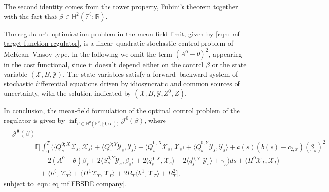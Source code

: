 \documentclass[11pt,twoside]{amsart}
\theoremstyle{definition}
\numberwithin{equation}{section}
\newcommand{\E}{\mathbb{E}}
\newcommand{\F}{\mathbb{F}}
\newcommand{\R}{\mathbb{R}}
\renewcommand{\bar}{\overline}
\begin{document}
The second identity comes from the tower property, Fubini's theorem together with the fact that $\beta\in \mathbb{H}^2(\F^0;\R)$. 

The regulator’s optimisation problem in the mean-field limit, given by \eqref{eqn: mf target function regulator}, is a linear–quadratic stochastic control problem of McKean–Vlasov type. In the following we omit the term $(A^0 - \theta)^2$, appearing in the cost functional, since it doesn't depend either on the control $\beta$ or the state variable $(\mathcal{X}, B, \mathcal{Y})$. The state variables satisfy a forward–backward system of stochastic differential equations driven by idiosyncratic and common sources of uncertainty, with the solution indicated by $(\mathcal{X}, B, \mathcal{Y}, Z^0, Z)$. 


In conclusion, the mean-field formulation of the optimal control problem of the regulator is given by $\inf_{\beta \in \mathbb{H}^2(\F^0;[0,\infty))}\mathcal{J}^0(\beta)$, where
\begin{align}
&\label{eqn: convex target function mf regulator}
    \mathcal{J}^0(\beta) \\
    &\nonumber\qquad = \E\Bigg[ \int_0^T (\langle Q^{0;X}_s \mathcal{X}_s,\mathcal{X}_s\rangle+\langle Q^{0;Y}_s \mathcal{Y}_s,\mathcal{Y}_s\rangle + \langle \bar{Q}^{0;X}_s \bar{\mathcal{X}}_s, \bar{\mathcal{X}}_s\rangle+ \langle \bar{Q}^{0;Y}_s \bar{\mathcal{Y}}_s, \bar{\mathcal{Y}}_s\rangle +a(s)(b(s) -  c_{2,x})( \beta_s)^2\\
    &\nonumber\qquad \qquad  -2(A^0 - \theta)\beta_s+ 2 \langle S^{0;Y}_s \bar{\mathcal{Y}}_s , \beta_s \rangle + 2 \langle q^{0;X}_s , \mathcal{X}_s\rangle + 2 \langle q^{0;Y}_s ,\mathcal{Y}_s\rangle + \gamma_5) ds + \langle H^0 \mathcal{X}_T , \mathcal{X}_T\rangle\\
    &\nonumber\qquad\qquad+ \langle h^0, \mathcal{X}_T\rangle+ \langle H^1\bar{\mathcal{X}}_T, \bar{\mathcal{X}}_T\rangle + 2B_T\langle h^1,\bar{\mathcal{X}}_T\rangle + B^2_T\Bigg],
\end{align}
subject to \eqref{eqn: eq mf FBSDE company}. 
\end{document}
